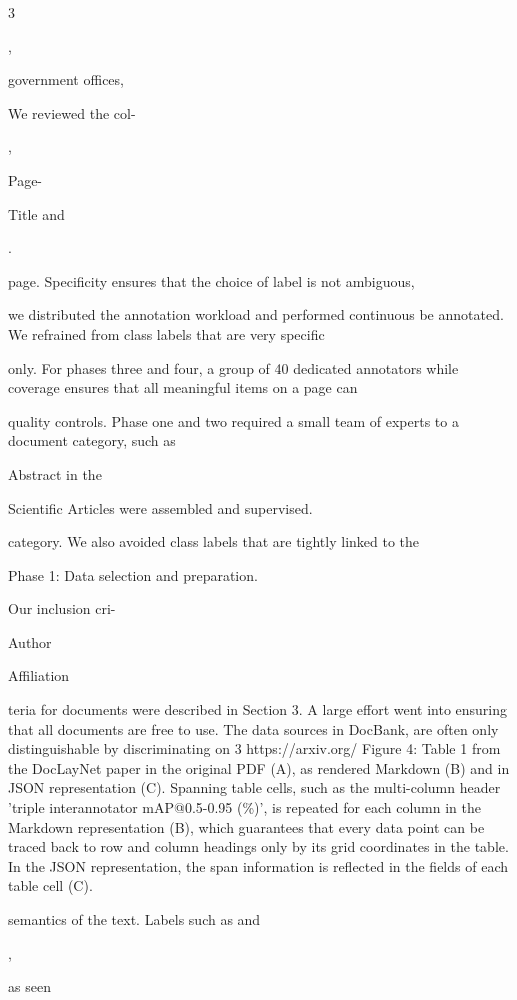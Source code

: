 3

,

government offices,

We reviewed the col-

,

Page-

Title and

.

page. Specificity ensures that the choice of label is not ambiguous,

\begin{figure}[h]
\end{figure}

we distributed the annotation workload and performed continuous be annotated. We refrained from class labels that are very specific

only. For phases three and four, a group of 40 dedicated annotators while coverage ensures that all meaningful items on a page can

quality controls. Phase one and two required a small team of experts to a document category, such as

Abstract in the

Scientific Articles were assembled and supervised.

category. We also avoided class labels that are tightly linked to the

Phase 1: Data selection and preparation.

Our inclusion cri-

Author

Affiliation

teria for documents were described in Section 3. A large effort went into ensuring that all documents are free to use. The data sources in DocBank, are often only distinguishable by discriminating on 3 https://arxiv.org/ Figure 4: Table 1 from the DocLayNet paper in the original PDF (A), as rendered Markdown (B) and in JSON representation (C). Spanning table cells, such as the multi-column header 'triple interannotator mAP@0.5-0.95 (\%)', is repeated for each column in the Markdown representation (B), which guarantees that every data point can be traced back to row and column headings only by its grid coordinates in the table. In the JSON representation, the span information is reflected in the fields of each table cell (C).

semantics of the text. Labels such as and

,

as seen
